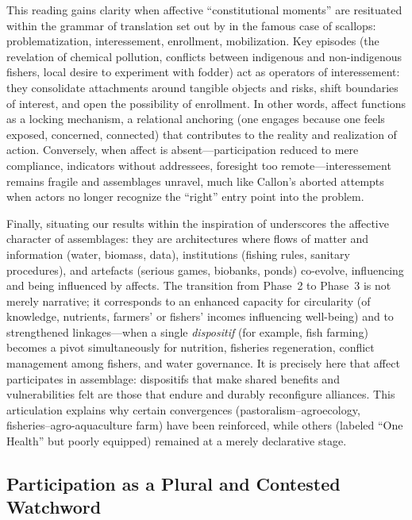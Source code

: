 \documentclass{article}
\begin{document}
This reading gains clarity when affective “constitutional moments” are resituated within the grammar of translation set out by \textcite{callon_techno-economic_1990} in the famous case of scallops: problematization, interessement, enrollment, mobilization. Key episodes (the revelation of chemical pollution, conflicts between indigenous and non-indigenous fishers, local desire to experiment with fodder) act as operators of interessement: they consolidate attachments around tangible objects and risks, shift boundaries of interest, and open the possibility of enrollment. In other words, affect functions as a locking mechanism, a relational anchoring (one engages because one feels exposed, concerned, connected) that contributes to the reality and realization of action. Conversely, when affect is absent—participation reduced to mere compliance, indicators without addressees, foresight too remote—interessement remains fragile and assemblages unravel, much like Callon’s aborted attempts when actors no longer recognize the “right” entry point into the problem.  

Finally, situating our results within the inspiration of \textcite{hertz_knowledge_2025} underscores the affective character of assemblages: they are architectures where flows of matter and information (water, biomass, data), institutions (fishing rules, sanitary procedures), and artefacts (serious games, biobanks, ponds) co-evolve, influencing and being influenced by affects. The transition from Phase~2 to Phase~3 is not merely narrative; it corresponds to an enhanced capacity for circularity (of knowledge, nutrients, farmers’ or fishers’ incomes influencing well-being) and to strengthened linkages—when a single \textit{dispositif} (for example, fish farming) becomes a pivot simultaneously for nutrition, fisheries regeneration, conflict management among fishers, and water governance. It is precisely here that affect participates in assemblage: dispositifs that make shared benefits and vulnerabilities felt are those that endure and durably reconfigure alliances. This articulation explains why certain convergences (pastoralism–agroecology, fisheries–agro-aquaculture farm) have been reinforced, while others (labeled “One Health” but poorly equipped) remained at a merely declarative stage.  

\subsection{Participation as a Plural and Contested Watchword}
\end{document}
